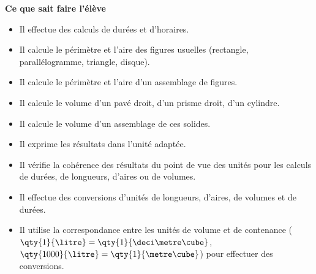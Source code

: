 \documentclass[10pt]{article}
\newcommand{\RR}{\begin{tikzpicture} \draw[Bleu,fill=Bleu] (0,0) circle (0.06); \end{tikzpicture}}
\newenvironment{savoireleves}{%
    \renewcommand{\labelitemi}{\RR}%
    \color{black}%
    \par\textbf{Ce que sait faire l'élève}
    \begin{itemize}
    \setlength{\itemsep}{-0.2em}%
}{
    \end{itemize}
}
\begin{document}
    \begin{savoireleves}
        \item Il effectue des calculs de durées et d’horaires.
        \item Il calcule le périmètre et l’aire des figures usuelles (rectangle, parallélogramme, triangle, disque).
        \item Il calcule le périmètre et l’aire d’un assemblage de figures.
        \item Il calcule le volume d’un pavé droit, d’un prisme droit, d’un cylindre.
        \item Il calcule le volume d’un assemblage de ces solides.
        \item Il exprime les résultats dans l’unité adaptée.
        \item Il vérifie la cohérence des résultats du point de vue des unités pour les calculs de durées, de longueurs, d’aires ou de volumes.
        \item Il effectue des conversions d’unités de longueurs, d’aires, de volumes et de durées.
        \item Il utilise la correspondance entre les unités de volume et de contenance ($\qty{1}{\litre} = \qty{1}{\deci\metre\cube}$, $\qty{1000}{\litre} = \qty{1}{\metre\cube}$) pour effectuer des conversions.
    \end{savoireleves}
\end{document}
